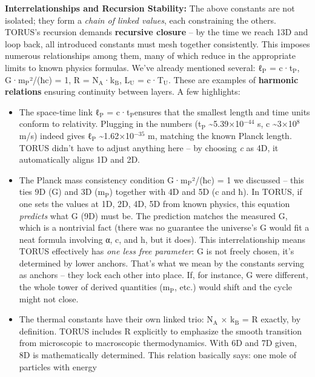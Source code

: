 \documentclass[]{article}
\newcommand{\subscript}[1]{\ensuremath{_{\mathrm{#1}}}}
\newcommand{\superscript}[1]{\ensuremath{^{\mathrm{#1}}}}
\begin{document}
\textbf{Interrelationships and Recursion Stability:} The above constants
are not isolated; they form a \emph{chain of linked values}, each
constraining the others. TORUS's recursion demands \textbf{recursive
closure} -- by the time we reach 13D and loop back, all introduced
constants must mesh together consistently. This imposes numerous
relationships among them, many of which reduce in the appropriate limits
to known physics formulas. We've already mentioned several:
ℓ\subscript{P} =
c·t\subscript{P}​,
G·m\subscript{P}²/(ħc) = 1,
R =
N\subscript{A}·k\subscript{B},
L\subscript{U} =
c·T\subscript{U}. These are
examples of \textbf{harmonic relations} ensuring continuity between
layers. A few highlights:

\begin{itemize}
\item
  The space-time link
  ℓ\subscript{P} =
  c·t\subscript{P}​ ensures
  that the smallest length and time units conform to relativity.
  Plugging in the numbers
  (t\subscript{P}
  \textasciitilde{}5.39×10\superscript{−44} s, c \textasciitilde{}3×10\superscript{8} m/s)
  indeed gives
  ℓ\subscript{P}
  \textasciitilde{}1.62×10\superscript{−35} m, matching the known Planck length.
  TORUS didn't have to adjust anything here -- by choosing \emph{c} as
  4D, it automatically aligns 1D and 2D.
\item
  The Planck mass consistency condition
  G·m\subscript{P}²/(ħc) =
  1​ we discussed -- this ties 9D (G) and 3D
  (m\subscript{P}) together
  with 4D and 5D (c and ħ). In TORUS, if one sets the values at 1D, 2D,
  4D, 5D from known physics, this equation \emph{predicts} what G (9D)
  must be. The prediction matches the measured G, which is a nontrivial
  fact (there was no guarantee the universe's G would fit a neat formula
  involving α, c, and h, but it does). This interrelationship means
  TORUS effectively has \emph{one less free parameter}: G is not freely
  chosen, it's determined by lower anchors​. That's what we mean by the
  constants serving as anchors -- they lock each other into place. If,
  for instance, G were different, the whole tower of derived quantities
  (m\subscript{P}, etc.)
  would shift and the cycle might not close.
\item
  The thermal constants have their own linked trio:
  N\subscript{A} ×
  k\subscript{B} = R
  exactly, by definition. TORUS includes R explicitly to emphasize the
  smooth transition from microscopic to macroscopic thermodynamics​.
  With 6D and 7D given, 8D is mathematically determined. This relation
  basically says: one mole of particles with energy

\end{itemize}
\end{document}
